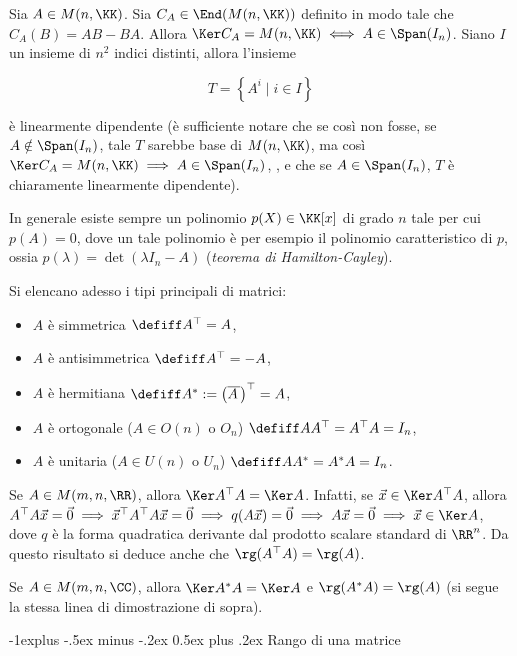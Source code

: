 \documentclass[10pt,landscape]{article}
\makeatletter
\renewcommand{\subsection}{\@startsection{subsection}{2}{0mm}%
	{-1explus -.5ex minus -.2ex}%
	{0.5ex plus .2ex}%
	{\normalfont\normalsize\bfseries}}
\makeatother
\begin{document}
\begin{multicols}{3}
		Sia $A \in M(n, \KK)$. Sia $C_A \in \End(M(n, \KK))$ definito in modo
		tale che $C_A(B) = AB - BA$. Allora $\Ker C_A = M(n, \KK)
		\iff A \in \Span(I_n)$. Siano $I$ un insieme di $n^2$ indici
		distinti, allora l'insieme
		
		\[ T = \left\{ A^i \mid i \in I \right\} \]
		
		è linearmente dipendente (è sufficiente notare che
		se così non fosse, se $A \notin \Span(I_n)$,
		tale $T$ sarebbe base di $M(n, \KK)$, ma
		così $\Ker C_A = M(n, \KK) \implies A \in \Span(I_n)$,
		\Lightning{}, e che se $A \in \Span(I_n)$, $T$
		è chiaramente linearmente dipendente).
		
		In generale esiste sempre un polinomio $p(X) \in \KK[x]$
		di grado $n$ tale per cui $p(A) = 0$, dove un tale polinomio
		è per esempio il polinomio caratteristico di $p$, ossia $p(\lambda)=
		\det(\lambda I_n - A)$ (\textit{teorema di 
			Hamilton-Cayley}).
		
		Si elencano adesso i tipi principali di matrici:
		\begin{itemize}
			\item $A$ è simmetrica $\defiff A^\top = A$,
			\item $A$ è antisimmetrica $\defiff A^\top = -A$,
			\item $A$ è hermitiana $\defiff A^* := \left(\overline{A\,}\right)^\top = A$,
			\item $A$ è ortogonale ($A \in O(n)$ o $O_n$) $\defiff AA^\top = A^\top A = I_n$,
			\item $A$ è unitaria ($A \in U(n)$ o $U_n$) $\defiff AA^* = A^*A = I_n$.
		\end{itemize}
		
		Se $A \in M(m, n, \RR)$, allora $\Ker A^\top A = \Ker A$. Infatti, se $\vec x \in \Ker A^\top A$, allora $A^\top A \vec x = \vec 0 \implies \vec x ^\top A^\top A \vec x = \vec 0 \implies q(A \vec x) = \vec 0 \implies A \vec x = \vec 0 \implies \vec x \in \Ker A$, dove $q$ è la forma quadratica derivante dal prodotto scalare standard
		di $\RR^n$. Da questo risultato si deduce anche che $\rg(A^\top A) = \rg(A)$. \\
		\vskip 0.05in
		
		Se $A \in M(m, n, \CC)$, allora $\Ker A^* A = \Ker A$ e $\rg (A^* A) = \rg(A)$ (si segue la stessa linea
		di dimostrazione di sopra).
		
		\subsection{Rango di una matrice}
		

\end{multicols}
\end{document}
